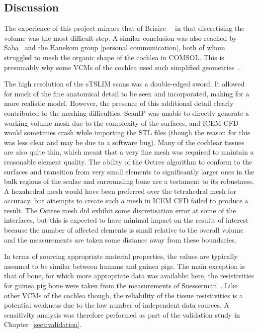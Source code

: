 
\subsection{Discussion}

The experience of this project mirrors that of
Briaire~\etal{}~\cite{briaire2000mesh} in that discretising the volume was the
most difficult step. A similar conclusion was also reached by
Saba~\cite[Appendix G]{saba2012} and the Hanekom group [personal communication],
both of whom struggled to mesh the organic shape of the cochlea in COMSOL. This
is presumably why some VCMs of the cochlea used such simplified
geometries~\cite{finley1990,tognola2007}.

The high resolution of the sTSLIM scans was a double-edged sword. It allowed for
much of the fine anatomical detail to be seen and incorporated, making for a
more realistic model. However, the presence of this additional detail clearly
contributed to the meshing difficulties. ScanIP was unable to directly generate
a working volume mesh due to the complexity of the surfaces, and ICEM CFD would
sometimes crash while importing the STL files (though the reason for this was
less clear and may be due to a software bug). Many of the cochlear tissues are
also quite thin, which meant that a very fine mesh was required to maintain a
reasonable element quality. The ability of the Octree algorithm to conform to
the surfaces and transition from very small elements to significantly larger
ones in the bulk regions of the scalae and surrounding bone are a testament to
its robustness. A hexahedral mesh would have been preferred over the tetrahedral
mesh for accuracy, but attempts to create such a mesh in ICEM CFD failed to
produce a result. The Octree mesh did exhibit some discretisation error at some
of the interfaces, but this is expected to have minimal impact on the results of
interest because the number of affected elements is small relative to the
overall volume and the measurements are taken some distance away from these
boundaries.

In terms of sourcing appropriate material properties, the values are typically
assumed to be similar between humans and guinea pigs. The main exception is that
of bone, for which more appropriate data was available: here, the resistivities
for guinea pig bone were taken from the measurements of
Suesserman~\cite{suesserman1992}. Like other VCMs of the cochlea though, the
reliability of the tissue resistivities is a potential weakness due to the low
number of independent data sources. A sensitivity analysis was therefore
performed as part of the validation study in Chapter~\ref{sect:validation}.

